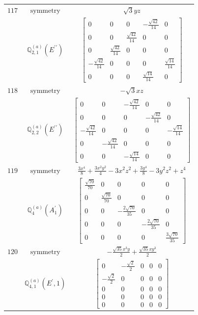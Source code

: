 \documentclass[fleqn,8pt,landscape]{jsarticle}
\begin{document}
\begin{longtable}{ccc}
$ 117 $ & $ \text{symmetry} $ & $ \sqrt{3} y z $ \\
$  $ & $ \mathbb{Q}_{2,1}^{(a)}(E^{\prime\prime}) $ & $ \begin{bmatrix} 0 & 0 & 0 & - \frac{\sqrt{42}}{14} & 0 \\ 0 & 0 & \frac{\sqrt{42}}{14} & 0 & 0 \\ 0 & \frac{\sqrt{42}}{14} & 0 & 0 & 0 \\ - \frac{\sqrt{42}}{14} & 0 & 0 & 0 & \frac{\sqrt{14}}{14} \\ 0 & 0 & 0 & \frac{\sqrt{14}}{14} & 0 \end{bmatrix} $ \\ \hline
$ 118 $ & $ \text{symmetry} $ & $ - \sqrt{3} x z $ \\
$  $ & $ \mathbb{Q}_{2,2}^{(a)}(E^{\prime\prime}) $ & $ \begin{bmatrix} 0 & 0 & - \frac{\sqrt{42}}{14} & 0 & 0 \\ 0 & 0 & 0 & - \frac{\sqrt{42}}{14} & 0 \\ - \frac{\sqrt{42}}{14} & 0 & 0 & 0 & - \frac{\sqrt{14}}{14} \\ 0 & - \frac{\sqrt{42}}{14} & 0 & 0 & 0 \\ 0 & 0 & - \frac{\sqrt{14}}{14} & 0 & 0 \end{bmatrix} $ \\ \hline
$ 119 $ & $ \text{symmetry} $ & $ \frac{3 x^{4}}{8} + \frac{3 x^{2} y^{2}}{4} - 3 x^{2} z^{2} + \frac{3 y^{4}}{8} - 3 y^{2} z^{2} + z^{4} $ \\
$  $ & $ \mathbb{Q}_{4}^{(a)}(A_{1}^{\prime}) $ & $ \begin{bmatrix} \frac{\sqrt{70}}{70} & 0 & 0 & 0 & 0 \\ 0 & \frac{\sqrt{70}}{70} & 0 & 0 & 0 \\ 0 & 0 & - \frac{2 \sqrt{70}}{35} & 0 & 0 \\ 0 & 0 & 0 & - \frac{2 \sqrt{70}}{35} & 0 \\ 0 & 0 & 0 & 0 & \frac{3 \sqrt{70}}{35} \end{bmatrix} $ \\ \hline
$ 120 $ & $ \text{symmetry} $ & $ - \frac{\sqrt{35} x^{3} y}{2} + \frac{\sqrt{35} x y^{3}}{2} $ \\
$  $ & $ \mathbb{Q}_{4,1}^{(a)}(E^{\prime},1) $ & $ \begin{bmatrix} 0 & - \frac{\sqrt{2}}{2} & 0 & 0 & 0 \\ - \frac{\sqrt{2}}{2} & 0 & 0 & 0 & 0 \\ 0 & 0 & 0 & 0 & 0 \\ 0 & 0 & 0 & 0 & 0 \\ 0 & 0 & 0 & 0 & 0 \end{bmatrix} $ \\ \hline

\end{longtable}
\end{document}
